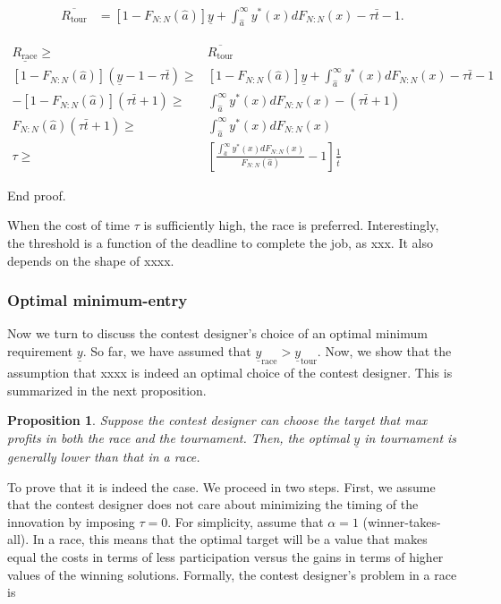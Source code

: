\documentclass[11pt, titlepage]{article}
\newtheorem{proposition}{Proposition}
\newcommand\deadline{\bar{t}}
\newcommand\target{\underline{y}}
\newcommand\race{\text{race}}
\newcommand\tournament{\text{tour}}
\newcommand\mtype{\hat{a}}
\begin{document}
\begin{align}
\overline {R_\tournament} & = 
  [1-F_{N:N}(\mtype)] \target + \int_{\mtype}^\infty y^*(x) dF_{N:N}(x) 
  - \tau \deadline - 1. 
\end{align}

\begin{align}
  \underline {R_\race} \geq & \overline {R_\tournament} \nonumber\\
  [1-F_{N:N}(\mtype)] (\target - 1 - \tau \deadline) \geq &
  [1-F_{N:N}(\mtype)] \target + \int_{\mtype}^\infty y^*(x) dF_{N:N}(x) 
  - \tau \deadline - 1 \nonumber\\
  - [1-F_{N:N}(\mtype)] (\tau\deadline + 1) \geq &
  \int_{\mtype}^\infty y^*(x) dF_{N:N}(x) 
  - (\tau \deadline + 1) \nonumber\\
  F_{N:N}(\mtype) (\tau \deadline + 1) \geq &
  \int_{\mtype}^\infty y^*(x) dF_{N:N}(x) \nonumber\\
  \tau \geq & 
    \left[
      \frac{\int_{\mtype}^\infty y^*(x) dF_{N:N}(x)}{F_{N:N}(\mtype)} -1 
    \right] \frac{1}{\deadline}
\end{align}

End proof.

When the cost of time \(\tau\) is sufficiently high, the race is
preferred. Interestingly, the threshold is a function of the deadline to
complete the job, as xxx. It also depends on the shape of xxxx.

\subsubsection{Optimal minimum-entry}\label{optimal-minimum-entry}

Now we turn to discuss the contest designer's choice of an optimal
minimum requirement \(\target\). So far, we have assumed that
\(\target_\race>\target_\tournament\). Now, we show that the assumption
that xxxx is indeed an optimal choice of the contest designer. This is
summarized in the next proposition.

\begin{proposition}
Suppose the contest designer can choose the target that max profits in both the race and the tournament. Then, the optimal $\target$ in tournament is generally lower than that in a race.
\end{proposition}

To prove that it is indeed the case. We proceed in two steps. First, we
assume that the contest designer does not care about minimizing the
timing of the innovation by imposing \(\tau = 0\). For simplicity,
assume that \(\alpha=1\) (winner-takes-all). In a race, this means that
the optimal target will be a value that makes equal the costs in terms
of less participation versus the gains in terms of higher values of the
winning solutions. Formally, the contest designer's problem in a race is
\end{document}
